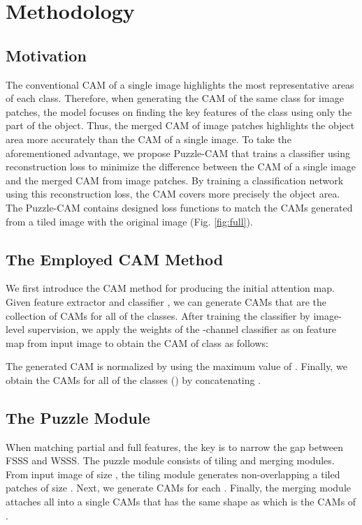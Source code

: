 \documentclass{article}
\begin{document}
\section{Methodology}
\label{sec:methodology}



\subsection{Motivation}
\label{ssec:motivation}





The conventional CAM of a single image highlights the most representative areas of each class. 
Therefore, when generating the CAM of the same class for image patches, the model focuses on finding the key features of the class using only the part of the object.
Thus, the merged CAM of image patches highlights the object area more accurately than the CAM of a single image. 
To take the aforementioned advantage, we propose Puzzle-CAM that trains a classifier using reconstruction loss to minimize the difference between the CAM of a single image and the merged CAM from image patches. 
By training a classification network using this reconstruction loss, the CAM covers more precisely the object area.
The Puzzle-CAM contains designed loss functions to match the CAMs generated from a tiled image with the original image (Fig. \ref{fig:full}).


\subsection{The Employed CAM Method}
\label{ssec:cam}
We first introduce the CAM method for producing the initial attention map.
Given feature extractor  and classifier , we can generate CAMs  that are the collection of CAMs for all of the classes.
After training the classifier by image-level supervision, we apply the weights of the -channel classifier as  on feature map  from input image  to obtain the CAM of class  as follows: 



The generated CAM is normalized by using the maximum value of .
Finally, we obtain the CAMs for all of the classes () by concatenating . 

\subsection{The Puzzle Module}
\label{ssec:module}
When matching partial and full features, the key is to narrow the gap between FSSS and WSSS.
The puzzle module consists of tiling and merging modules.
From input image  of size , the tiling module generates non-overlapping a tiled patches  of size .
Next, we generate  CAMs for each .
Finally, the merging module attaches all  into a single CAMs  that has the same shape as  which is the CAMs of .
\end{document}
